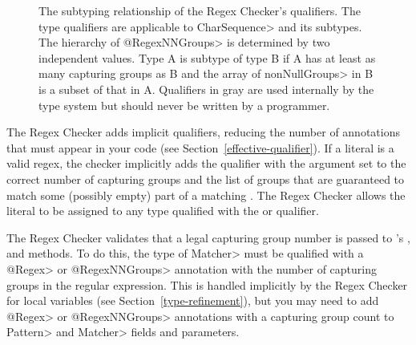\begin{figure}
    \caption{The subtyping relationship of the Regex Checker's qualifiers.
    The type qualifiers are applicable to \<CharSequence> and its subtypes.
    The hierarchy of \<@RegexNNGroups> is determined by two independent
    values. Type A is subtype of type B if A has at least as many capturing
    groups as B and the array of \<nonNullGroups> in B is a subset of that
    in A. Qualifiers in gray are used internally by the type system but
    should never be written by a programmer.}
\label{fig-regex-hierarchy-2}
\end{figure}




The Regex Checker adds
implicit qualifiers, reducing the number of annotations that must appear
in your code (see Section~\ref{effective-qualifier}).
If a  literal is a valid regex,
the checker implicitly adds the  qualifier with
the argument set to the correct number of capturing groups and the list
of groups that are guaranteed to match some (possibly empty) part of a
matching .
The Regex Checker allows
the  literal to be assigned to any type qualified with the
 or  qualifier.



The Regex Checker validates that a legal capturing group number is passed
to 's
,
 and
 methods. To do this,
the type of \<Matcher> must be qualified with a \<@Regex> or \<@RegexNNGroups>
annotation with the number of capturing groups in the regular expression. This is
handled implicitly by the Regex Checker for local variables (see
Section~\ref{type-refinement}), but you may need to add \<@Regex> or \<@RegexNNGroups>
annotations with a capturing group count to \<Pattern> and \<Matcher> fields and
parameters.



